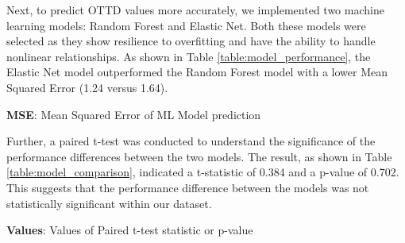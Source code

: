 \documentclass[11pt]{article}
\begin{document}
Next, to predict OTTD values more accurately, we implemented two machine learning models: Random Forest and Elastic Net. Both these models were selected as they show resilience to overfitting and have the ability to handle nonlinear relationships. As shown in Table {}\ref{table:model_performance}, the Elastic Net model outperformed the Random Forest model with a lower Mean Squared Error (1.24 versus 1.64). 

\begin{table}[h]
\caption{Performance metrics of the Random Forest and Elastic Net models}
\label{table:model_performance}
\begin{threeparttable}
\renewcommand{\TPTminimum}{\linewidth}
\begin{tablenotes}
\footnotesize
\item \textbf{MSE}: Mean Squared Error of ML Model prediction
\end{tablenotes}
\end{threeparttable}
\end{table}


Further, a paired t-test was conducted to understand the significance of the performance differences between the two models. The result, as shown in Table {}\ref{table:model_comparison}, indicated a t-statistic of 0.384 and a p-value of 0.702. This suggests that the performance difference between the models was not statistically significant within our dataset.

\begin{table}[h]
\caption{Paired t-test comparing the performance of the Random Forest and Elastic Net models.}
\label{table:model_comparison}
\begin{threeparttable}
\renewcommand{\TPTminimum}{\linewidth}
\begin{tablenotes}
\footnotesize
\item \textbf{Values}: Values of Paired t-test statistic or p-value
\end{tablenotes}
\end{threeparttable}
\end{table}
\end{document}
